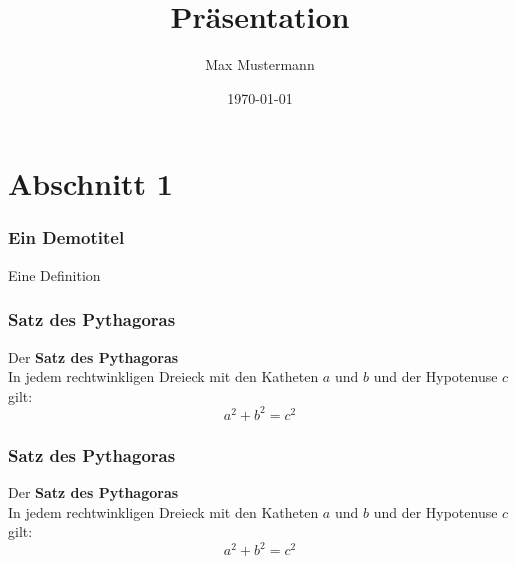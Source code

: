\documentclass{beamer}
\title{Präsentation}
\author{Max Mustermann}
\date{\today}
\begin{document}
\maketitle
\frame{\tableofcontents[currentsection]}

\section{Abschnitt 1}
\begin{frame} %
  \frametitle{Ein Demotitel} %
  \begin{Definition} %
    Eine Definition
  \end{Definition}
\end{frame}  

\begin{frame} %
  \frametitle{Satz des Pythagoras}    %
  \begin{Theorem}    
    Der \textbf{Satz des Pythagoras}  \\ 
    \vspace{2 mm}
    In jedem rechtwinkligen Dreieck mit den Katheten $a$ und $b$ und 
    der Hypotenuse $c$ gilt:   
    $$ a^2 + b^2 = c^2 $$
  \end{Theorem}
\end{frame}

\begin{frame} %
  \frametitle{Satz des Pythagoras}    %
    Der \textbf{Satz des Pythagoras}  \\ 
    \vspace{2 mm}
    In jedem rechtwinkligen Dreieck mit den Katheten $a$ und $b$ und 
    der Hypotenuse $c$ gilt:   
    $$ a^2 + b^2 = c^2 $$
\end{frame}
\end{document}
